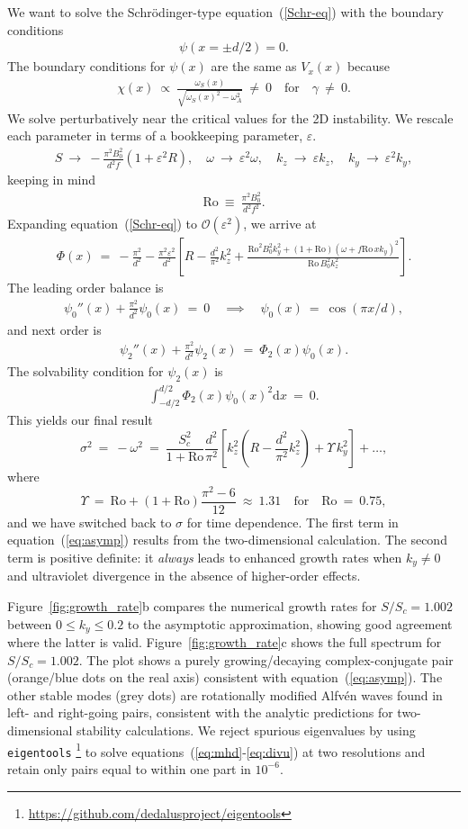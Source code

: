 \documentclass{rsproca_new}%
\newcommand{\SSC}{S/S_{c}}
\newcommand\Beq{\begin{eqnarray}}
\newcommand\Eeq{\end{eqnarray}}
\newcommand{\Ro}{\mathrm{Ro}}
\newcommand{\eps}{\varepsilon}
\begin{document}
We want to solve the Schr\"{o}dinger-type equation~(\ref{Schr-eq}) with the boundary conditions 
\Beq
\psi(x=\pm d/2) = 0.
\Eeq
The boundary conditions for $\psi(x)$ are the same as $V_{x}(x)$ because 
\Beq
\chi(x) \ \propto \ \frac{\omega_{S}(x)}{\sqrt{\omega_{S}(x)^2-\omega _A^2}} \  \ne \ 0 \quad \text{for} \quad \gamma \ \ne \ 0.
\Eeq
We solve perturbatively near the critical values for the 2D instability. We rescale each parameter in terms of a bookkeeping parameter, $\eps$.
\Beq
S  \ \to \  - \frac{\pi ^2 B_{0}^2}{d^2 f} ( 1 + \eps^{2} R), \quad \omega \ \to \ \eps^{2} \omega , \quad k_{z} \ \to \ \eps k_{z}, \quad k_{y} \ \to \ \eps^{2} k_{y},
\Eeq 
keeping in mind
\Beq
\Ro  \ \equiv  \ \frac{\pi ^2 B_{0}^2}{d^2 f^{2}}.
\Eeq
Expanding equation~(\ref{Schr-eq}) to $\mathcal{O}(\eps^{2})$, we arrive at
\Beq
\Phi(x) \ = \ -\frac{\pi^{2}}{d^{2}} - \frac{\pi^{2} \eps^{2}}{d^{2}}\left[R - \frac{d^2 }{\pi^2}k_z^2 + \frac{\Ro^2 B_0^2  k_y^2+(1+\Ro) (\omega + f \Ro\, x k_y) ^2}{ \Ro\, B_0^2
   k_z^2} \right].
\Eeq
The leading order balance is
\Beq
\psi_{0}''(x) + \frac{\pi^{2}}{d^{2}}  \psi_{0}(x) \ = \ 0  \quad \implies \quad \psi_{0}(x) \ = \ \cos(\pi x / d),
\Eeq
and next order is
\Beq
\psi_{2}''(x) + \frac{\pi^{2}}{d^{2}}  \psi_{2}(x) \ = \  \Phi_{2}(x)\psi_{0}(x) .
\Eeq
The solvability condition for $\psi_{2}(x)$ is 
\Beq
\int_{-d/2}^{d/2} \Phi_{2}(x)\psi_{0}(x)^{2} \text{d} x \ = \ 0.
\Eeq
This yields our final result
\begin{equation}\label{eq:asymp}
\sigma^{2}\ = \ - \omega^{2} \ = \  \frac{S_{c}^{2}}{1+\Ro} \frac{d^{2}}{\pi^{2}} \left[ k_{z}^{2}\left(R-\frac{d^2}{\pi^{2}}k_{z}^{2}\right)+\Upsilon\,k_{y}^{2}\right]+\ldots,
\end{equation}
where
\begin{equation}
\Upsilon \ = \  \Ro + (1+ \Ro) \frac{\pi^{2}-6}{12}  \ \approx \ 1.31\quad\text{for}\quad{\Ro} \ = \ 0.75,
\end{equation}
and we have switched back to $\sigma$ for time dependence.
The first term in equation~(\ref{eq:asymp}) results from the two-dimensional calculation.
The second term is positive definite: it \emph{always} leads to enhanced growth rates when $k_{y}\neq0$ and ultraviolet divergence in the absence of higher-order effects.

Figure~\ref{fig:growth_rate}b compares the numerical growth rates for $\SSC=1.002$ between $0\le{k_{y}}\le0.2$ to the asymptotic approximation, showing good agreement where the latter is valid.
Figure~\ref{fig:growth_rate}c shows the full spectrum for $\SSC=1.002$.
The plot shows a purely growing/decaying complex-conjugate pair (orange/blue dots on the real axis) consistent with equation~(\ref{eq:asymp}).
The other stable modes (grey dots) are rotationally modified Alfv\'{e}n waves found in left- and right-going pairs, consistent with the analytic predictions for two-dimensional stability calculations.
We reject spurious eigenvalues by using \texttt{eigentools} \footnote{\protect\url{https://github.com/dedalusproject/eigentools}} to solve equations~(\ref{eq:mhd}-\ref{eq:divu}) at two resolutions and retain only pairs equal to within one part in $10^{-6}$.
\end{document}
